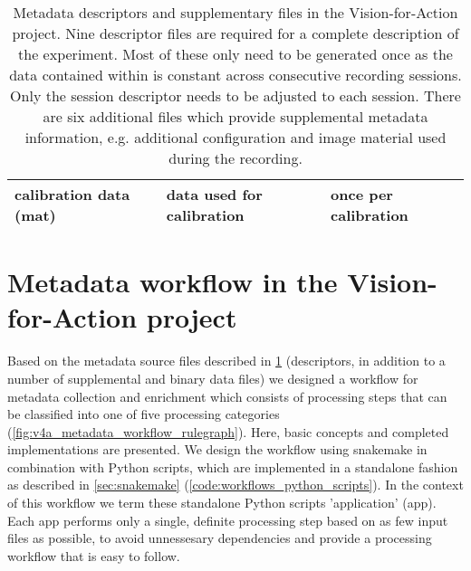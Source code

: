 \begin{table}[]
\begin{tabular}{lll}
\multicolumn{1}{|l|}{calibration data (mat)}       & \multicolumn{1}{l|}{data used for calibration}                                                                         & \multicolumn{1}{l|}{once per calibration}                                            \\ \hline
\end{tabular}
\caption[Metadata files in the Vision-for-Action project]{Metadata descriptors and supplementary files in the Vision-for-Action project. Nine  descriptor files are required for a complete description of the experiment. Most of these only need to be generated once as the data contained within is constant across consecutive recording sessions. Only the session descriptor needs to be adjusted to each session. There are six additional files which provide supplemental metadata information, e.g. additional configuration and image material used during the recording.}
\label{tab:v4a_metadata_files}
\end{table}

\section{Metadata workflow in the Vision-for-Action project}

Based on the metadata source files described in \cref{tab:v4a_metadata_files} (descriptors, in addition to a number of supplemental and binary data files) we designed a workflow for metadata collection and enrichment which consists of processing steps that can be classified into one of five processing categories (\cref{fig:v4a_metadata_workflow_rulegraph}). Here,  basic concepts and completed implementations are presented. We design the workflow using snakemake in combination with Python scripts, which are implemented in a standalone fashion as described in \cref{sec:snakemake} (\cref{code:workflows_python_scripts}). In the context of this workflow we term these standalone Python scripts 'application' (app). Each app performs only a single, definite processing step based on as few input files as possible, to avoid unnessesary dependencies and provide a processing workflow that is easy to follow.

